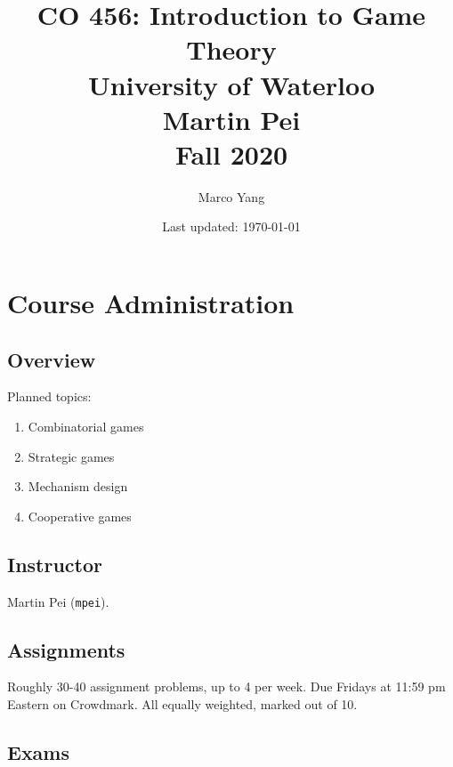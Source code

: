 \documentclass[12pt,letterpaper]{report}
\begin{document}

\title{
  \Huge
  \textbf{CO 456: Introduction to Game Theory} \\[\baselineskip]
  \large
  University of Waterloo \\
  Martin Pei \\
  Fall 2020
}
\author{Marco Yang}
\date{Last updated: \today}

{
  \sffamily
  \maketitle
}
\thispagestyle{empty}

\pagebreak
{}
\setcounter{page}{2}

{
  \sffamily
  \tableofcontents{\markboth{\contentsname}{}}
}

\pagebreak
{}

\section{Course Administration}

\subsection{Overview}

Planned topics:
\begin{enumerate}
  \item Combinatorial games
  \item Strategic games
  \item Mechanism design
  \item Cooperative games
\end{enumerate}

\subsection{Instructor}

Martin Pei (\texttt{mpei}).

\subsection{Assignments}

Roughly 30-40 assignment problems, up to 4 per week.
Due Fridays at 11:59 pm Eastern on Crowdmark.
All equally weighted, marked out of 10.

\subsection{Exams}
\end{document}
